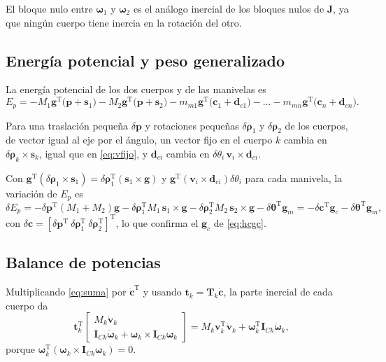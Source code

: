 \documentclass[11pt]{article}
\newcommand{\T}{^{\mathrm{T}}}
\newcommand{\pvec}{\mathbf{p}}
\newcommand{\wv}{\boldsymbol{\omega}}
\newcommand{\cd}{\dot{\mathbf{c}}}
\newcommand{\IC}[1]{\mathbf{I}_{C#1}}
\newcommand{\dth}{\delta\boldsymbol{\rho}}
\newcommand{\thv}{\boldsymbol{\theta}}
\begin{document}
El bloque nulo entre $\wv_1$ y $\wv_2$ es el análogo inercial de los bloques nulos de $\mathbf{J}$, ya que ningún cuerpo tiene inercia en la rotación del otro.

\subsection{Energía potencial y peso generalizado}

La energía potencial de los dos cuerpos y de las manivelas es
\begin{equation}
E_p=-M_1\mathbf{g}\T\big(\pvec+\mathbf{s}_1\big)-M_2\mathbf{g}\T\big(\pvec+\mathbf{s}_2\big)-m_{m1}\mathbf{g}\T\big(\mathbf{c}_1+\mathbf{d}_{c1}\big)-\dots-m_{mn}\mathbf{g}\T\big(\mathbf{c}_n+\mathbf{d}_{cn}\big).
\label{eq:Ep}
\end{equation}

Para una traslación pequeña $\delta\pvec$ y rotaciones pequeñas $\dth_1$ y $\dth_2$ de los cuerpos, de vector igual al eje por el ángulo, un vector fijo en el cuerpo $k$ cambia en $\dth_k\times\mathbf{s}_k$, igual que en \eqref{eq:vfijo}, y $\mathbf{d}_{ci}$ cambia en $\delta\theta_i\,\mathbf{v}_i\times\mathbf{d}_{ci}$.

Con $\mathbf{g}\T(\dth_1\times\mathbf{s}_1)=\dth_1\T(\mathbf{s}_1\times\mathbf{g})$ y $\mathbf{g}\T(\mathbf{v}_i\times\mathbf{d}_{ci})\delta\theta_i$ para cada manivela, la variación de $E_p$ es
\begin{equation}
\delta E_p=-\delta\pvec\T(M_1+M_2)\mathbf{g}-\dth_1\T M_1\,\mathbf{s}_1\times\mathbf{g}-\dth_2\T M_2\,\mathbf{s}_2\times\mathbf{g}-\delta\thv\T\mathbf{g}_m
=-\delta\mathbf{c}\T\mathbf{g}_c-\delta\thv\T\mathbf{g}_m ,
\label{eq:dEp}
\end{equation}
con $\delta\mathbf{c}=[\delta\pvec\T\ \dth_1\T\ \dth_2\T]\T$, lo que confirma el $\mathbf{g}_c$ de \eqref{eq:hcgc}.

\subsection{Balance de potencias}

Multiplicando \eqref{eq:suma} por $\cd\T$ y usando $\mathbf{t}_k=\mathbf{T}_k\cd$, la parte inercial de cada cuerpo da
\begin{equation}
\mathbf{t}_k\T
\begin{bmatrix}M_k\dot{\mathbf{v}}_k\\ \IC{k}\dot{\wv}_k+\wv_k\times\IC{k}\wv_k\end{bmatrix}
=M_k\mathbf{v}_k\T\dot{\mathbf{v}}_k+\wv_k\T\IC{k}\dot{\wv}_k ,
\label{eq:pot1}
\end{equation}
porque $\wv_k\T(\wv_k\times\IC{k}\wv_k)=0$.
\end{document}
